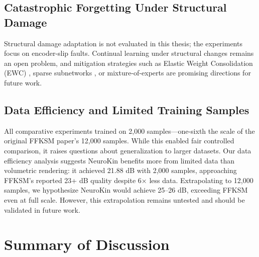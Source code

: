 \documentclass[12pt,a4paper,oneside]{report}
\begin{document}
\subsection{Catastrophic Forgetting Under Structural Damage}
\label{subsec:catastrophic_forgetting_under_structural_damage}

Structural damage adaptation is not evaluated in this thesis; the experiments focus on encoder-slip faults. Continual learning under structural changes remains an open problem, and mitigation strategies such as Elastic Weight Consolidation (EWC) \cite{kirkpatrick2017overcoming}, sparse subnetworks \cite{frankle2018lottery}, or mixture-of-experts \cite{mocanu2018scalable} are promising directions for future work.

\subsection{Data Efficiency and Limited Training Samples}
\label{subsec:data_efficiency_and_limited_training_samples}

All comparative experiments trained on 2,000 samples—one-sixth the scale of the original FFKSM paper's 12,000 samples. While this enabled fair controlled comparison, it raises questions about generalization to larger datasets. Our data efficiency analysis suggests NeuroKin benefits more from limited data than volumetric rendering: it achieved 21.88 dB with 2,000 samples, approaching FFKSM's reported 23+ dB quality despite 6× less data. Extrapolating to 12,000 samples, we hypothesize NeuroKin would achieve 25–26 dB, exceeding FFKSM even at full scale. However, this extrapolation remains untested and should be validated in future work.

\section{Summary of Discussion}
\end{document}
